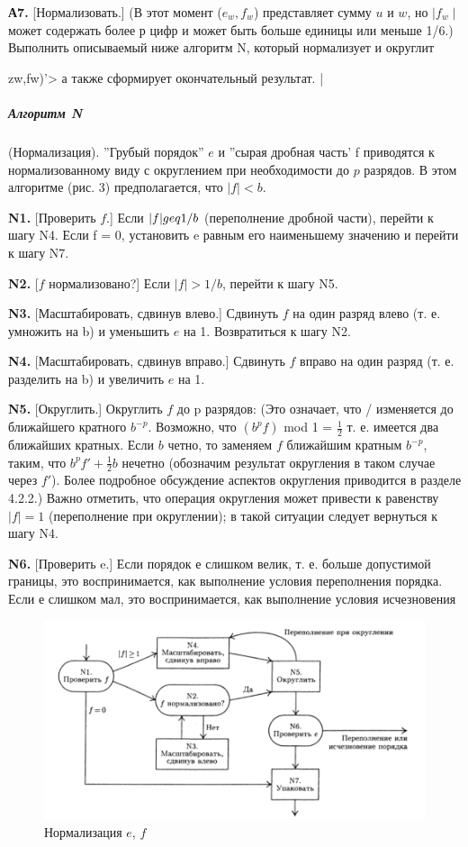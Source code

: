 \textbf{А7.} [Нормализовать.] (В этот момент ($e_w,f_w$) представляет сумму $u$ и $w$, но $\mid f_w\mid$ может содержать более р цифр и может быть больше единицы или меньше 1/6.) Выполнить описываемый ниже алгоритм N, который нормализует и округлит {zw,fw)'> а также сформирует окончательный результат. |

\subparagraph{Алгоритм N} (Нормализация). ''Грубый порядок'' $e$ и ''сырая дробная часть' f приводятся к нормализованному виду с округлением при необходимости до $p$ разрядов. В этом алгоритме (рис. 3) предполагается, что $|f| < b$.

\textbf{N1.} [Проверить $f$.] Если $|f| \\geq 1/b$ (переполнение дробной части), перейти к шагу N4. Если f = 0, установить e равным его наименьшему значению и перейти к шагу N7.

\textbf{N2.} [$f$ нормализовано?] Если $|f| > 1/b$, перейти к шагу N5.

\textbf{N3.} [Масштабировать, сдвинув влево.] Сдвинуть $f$ на один разряд влево (т. е. умножить на b) и уменьшить $e$ на 1. Возвратиться к шагу N2.

\textbf{N4.} [Масштабировать, сдвинув вправо.] Сдвинуть $f$ вправо на один разряд (т. е. разделить на b) и увеличить $e$ на 1.

\textbf{N5.} [Округлить.] Округлить $f$ до p разрядов: (Это означает, что / изменяется до ближайшего кратного $b^{-p}$. Возможно, что $(b^{p}f)$ mod 1 = $\frac{1}{2}$ т. е. имеется два ближайших кратных. Если $b$ четно, то заменяем $f$ ближайшим кратным $b^{-p}$, таким, что $b^{p}f' + \frac{1}{2}b$ нечетно (обозначим результат округления в таком случае через $f'$). Более подробное обсуждение аспектов округления приводится в разделе 4.2.2.) Важно отметить, что операция округления может привести к равенству $|f| = 1$ (переполнение при округлении); в такой ситуации следует вернуться к шагу N4.

\textbf{N6.} [Проверить e.] Если порядок $е$ слишком велик, т. е. больше допустимой границы, это воспринимается, как выполнение условия переполнения порядка. Если е слишком мал, это воспринимается, как выполнение условия исчезновения 
 
\begin{figure}

\begin{center}
\includegraphics[scale=.6]{s2.png}
\end{center}
\caption{Нормализация $e$, $f$}
\end{figure}

}
